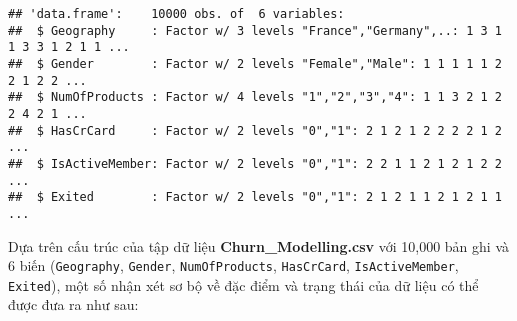 \documentclass[
]{article}
\newenvironment{Shaded}{\begin{snugshade}}{\end{snugshade}}
\newcommand{\FunctionTok}[1]{\textcolor[rgb]{0.13,0.29,0.53}{\textbf{#1}}}
\newcommand{\NormalTok}[1]{#1}
\newcommand{\OtherTok}[1]{\textcolor[rgb]{0.56,0.35,0.01}{#1}}
\newcommand{\SpecialCharTok}[1]{\textcolor[rgb]{0.81,0.36,0.00}{\textbf{#1}}}
\newcommand{\StringTok}[1]{\textcolor[rgb]{0.31,0.60,0.02}{#1}}
\begin{document}
\begin{Shaded}
\end{Shaded}

\begin{verbatim}
## 'data.frame':    10000 obs. of  6 variables:
##  $ Geography     : Factor w/ 3 levels "France","Germany",..: 1 3 1 1 3 3 1 2 1 1 ...
##  $ Gender        : Factor w/ 2 levels "Female","Male": 1 1 1 1 1 2 2 1 2 2 ...
##  $ NumOfProducts : Factor w/ 4 levels "1","2","3","4": 1 1 3 2 1 2 2 4 2 1 ...
##  $ HasCrCard     : Factor w/ 2 levels "0","1": 2 1 2 1 2 2 2 2 1 2 ...
##  $ IsActiveMember: Factor w/ 2 levels "0","1": 2 2 1 1 2 1 2 1 2 2 ...
##  $ Exited        : Factor w/ 2 levels "0","1": 2 1 2 1 1 2 1 2 1 1 ...
\end{verbatim}

Dựa trên cấu trúc của tập dữ liệu \textbf{Churn\_Modelling.csv} với
10,000 bản ghi và 6 biến (\texttt{Geography}, \texttt{Gender},
\texttt{NumOfProducts}, \texttt{HasCrCard}, \texttt{IsActiveMember},
\texttt{Exited}), một số nhận xét sơ bộ về đặc điểm và trạng thái của dữ
liệu có thể được đưa ra như sau:
\end{document}
